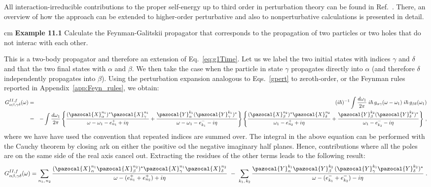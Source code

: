 All interaction-irreducible contributions to the proper self-energy up to third order in perturbation theory can be found in Ref.~\cite{Carbone2013Nov}. There, an overview of how the approach can be extended to higher-order perturbative and also to nonperturbative calculations is presented in detail.

 cm
\noindent
{\bf Example 11.1} Calculate the Feynman-Galitskii propagator that corresponds to the propagation of two particles or two holes that do not interac with each other.

This is a  two-body propagator and therefore an extension of Eq.~\eqref{eq:g1Time}. Let us we label  the two initial states with indices $\gamma$ and $\delta$ and that the two final states with $\alpha$ and $\beta$. We then take the case when the particle in state $\gamma$ propagates directly into $\alpha$ (and therefore $\delta$ independently propagates into $\beta$).  Using the perturbation expansion analogous to Eqs.~\ref{gpert} to zeroth-order, or the Feynman rules reported in Appendix~\ref{app:Feyn_rules}, we obtain:
\begin{eqnarray}
G^{II,f}_{\alpha \beta, \gamma \delta}(\omega) &=& (i\hbar)^{-1} \int \frac {d \omega_1}{2\pi} 
  \; i\hbar \,  g_{\alpha\gamma}(\omega-\omega_1) \; i\hbar \, g_{\beta\delta}(\omega_1)
\label{eq:GIIf_int} \\ \nonumber
&=& - \int \frac {d \omega_1}{2\pi}  
  \left\{ \frac{(\pazocal{X}^{n_1}_\alpha)^*  \pazocal{X}^{n_1}_\gamma}{\omega - \omega_1  - e^+_{n_1} + i\eta} 
        + \frac{\pazocal{Y}^{k_1}_\alpha  (\pazocal{Y}^{k_1}_\gamma)^*}{\omega - \omega_1  - e^-_{k_1} - i\eta}  \right\}
          \left\{ \frac{(\pazocal{X}^{n_2}_\beta)^*  \pazocal{X}^{n_2}_\delta}{\omega_1  - e^+_{n_2} + i\eta} 
        + \frac{\pazocal{Y}^{k_2}_\beta  (\pazocal{Y}^{k_2}_\delta)^*}{\omega_1  - e^-_{k_2} - i\eta}  \right\} \, ,
\end{eqnarray}
where we have have used the convention that repeated indices are summed over. The integral in the above equation can be performed with the Cauchy theorem by closing ark on either the positive od the negative imaginary half planes. Hence, contributions where all the poles are  on the same side of the real axis cancel out. Extracting the residues of the other terms leads to the following result:
\begin{equation}
G^{II,f}_{\alpha \beta, \gamma \delta}(\omega) =
\sum_{n_1, \, n_2} \frac{(\pazocal{X}^{n_1}_\alpha \pazocal{X}^{n_2}_\beta)^*  \pazocal{X}^{n_1}_\gamma \pazocal{X}^{n_2}_\delta}
                      {\omega  - (e^+_{n_1}  + e^+_{n_2}) + i\eta} 
~-~ \sum_{k_1, \, k_2} \frac{\pazocal{Y}^{k_1}_\alpha \pazocal{Y}^{k_2}_\beta \, (\pazocal{Y}^{k_1}_\gamma \pazocal{Y}^{k_2}_\delta)^*}
                     {\omega  - (e^-_{k_1} + e^-_{k_2}) - i\eta}   \; .
\label{eq:GIIf}
\end{equation}

